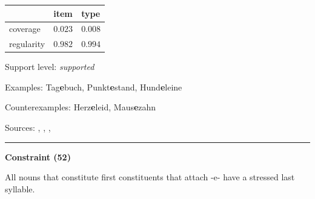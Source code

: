 \vspace{-0.25em}

\begin{table}[!ht]
\begin{center}
\setlength{\extrarowheight}{1pt}
\begin{tabularx}{\columnwidth}{|X|X|X|}
\hline
 & item & type \\
\hline
 coverage & $0.023$ & $0.008$ \\
\hline
 regularity & $0.982$ & $0.994$ \\
\hline
\end{tabularx}
\end{center}
\end{table}

\vspace{-1.35em}

\noindent
Support level: \textit{supported}

\vspace{0.3em}

\noindent
Examples: Tag\textbf{e}buch, Punkt\textbf{e}stand, Hund\textbf{e}leine

\noindent
Counterexamples: Herz\textbf{e}leid, Maus\textbf{e}zahn

\vspace{0.3em}

\noindent
Sources: \citet[9, 18]{kuerschner_2010}, \citet[5]{nuebling_szczepaniak_2008}, \citet[70, 81]{nuebling_szczepaniak_2013}, \citet[102]{ortner_mueller-bollhagen_1991}

\vspace{0.35em}
\hrule




\vspace{0.4em}

\begin{center}
\textbf{Constraint (52)}
\end{center}

\noindent
All nouns that constitute first constituents that attach -e- have a stressed last syllable.
\vspace{0.5em}


